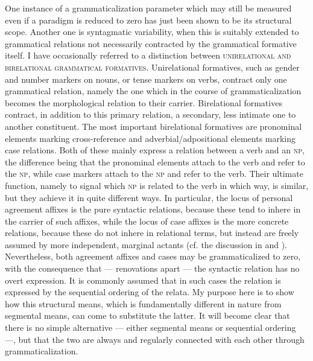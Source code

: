 One instance of a grammaticalization parameter which may still be measured even if a paradigm is reduced to zero has just been shown to be its structural scope. Another one is syntagmatic variability, when this is suitably extended to grammatical relations not necessarily contracted by the grammatical formative itself. I have occasionally referred to a distinction between \textsc{unirelational and birelational grammatical formatives}. Unirelational formatives, such as gender and number markers on nouns, or tense markers on verbs, contract only one grammatical relation, namely the one which in the course of grammaticalization becomes the morphological relation to their carrier. Birelational formatives contract, in addition to this primary relation, a secondary, less intimate one to another constituent. The most important birelational formatives are pronominal elements marking cross-reference and adverbial/adpositional elements marking case relations. Both of these mainly express a relation between a verb and an \textsc{np}, the difference being that the pronominal elements attach to the verb and refer to the \textsc{np}, while case markers attach to the \textsc{np} and refer to the verb. Their ultimate function, namely to signal which \textsc{np} is related to the verb in which way, is similar, but they achieve it in quite different ways. In particular, the locus of personal agreement affixes is the pure syntactic relations, because these tend to inhere in the carrier of such affixes, while the locus of case affixes is the more concrete relations, because these do not inhere in relational terms, but instead are freely assumed by more independent, marginal actants (cf. the discussion in  and \citealt[§~4]{Lehmann1983}). Nevertheless, both agreement affixes and cases may be grammaticalized to zero, with the consequence that — renovations apart — the syntactic relation has no overt expression. It is commonly assumed that in such cases the relation is expressed by the sequential ordering of the relata. My purpose here is to show how this structural means, which is fundamentally different in nature from segmental means, can come to substitute the latter. It will become clear that there is no simple alternative — either segmental means or sequential ordering —, but that the two are always and regularly connected with each other through grammaticalization.

